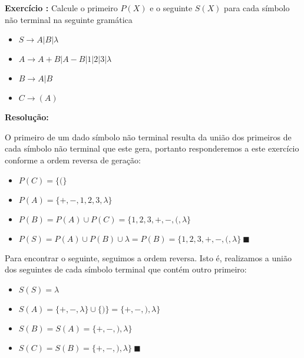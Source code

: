 

\setcounter{count}{0}
\newcommand{\exercise}[2]{%
  \stepcounter{count}%
  \noindent\textbf{Exercício \thecount:} Calcule o primeiro $P(X)$ e o seguinte $S(X)$ para cada símbolo não terminal na seguinte gramática
%
  \vspace{\baselineskip}%
  \begin{itemize}
    #1
  \end{itemize}
  \vspace{\baselineskip}%
  \noindent\textbf{Resolução:}%
  \vspace{\baselineskip}%
  
  #2 
  \vspace{2\baselineskip}%
}




\maketitle

\exercise {
	\item $S \rightarrow A | B | \lambda$
	\item $A \rightarrow A + B | A - B | 1 | 2 | 3 | \lambda$
	\item $B \rightarrow A | B$
	\item $C \rightarrow (A)$
} {
	O primeiro de um dado símbolo não terminal resulta da união dos primeiros de cada símbolo não terminal que este gera, portanto responderemos a este exercício conforme a ordem reversa de geração:

	\begin{itemize}
		\item $P(C) = \{(\}$
		\item $P(A) = \{+, -, 1, 2, 3, \lambda \}$
		\item $P(B) = P(A) \cup P(C) = \{ 1, 2, 3, +, -, (, \lambda \}$
		\item $P(S) = P(A) \cup P(B) \cup \lambda = P(B) = \{ 1, 2, 3, +, -, (, \lambda \}\ \blacksquare$
	\end{itemize}

	Para encontrar o seguinte, seguimos a ordem reversa. Isto é, realizamos a união dos seguintes de cada símbolo terminal que contém outro primeiro:

	\begin{itemize}
		\item $S(S) = {\lambda}$
		\item $S(A) = \{+, -, \lambda \} \cup \{)\} = \{+, -, ), \lambda\}$
		\item $S(B) = S(A) = \{+, -, ), \lambda\}$
		\item $S(C) = S(B) =  \{+, -, ), \lambda\}\ \blacksquare$
	\end{itemize}
}


